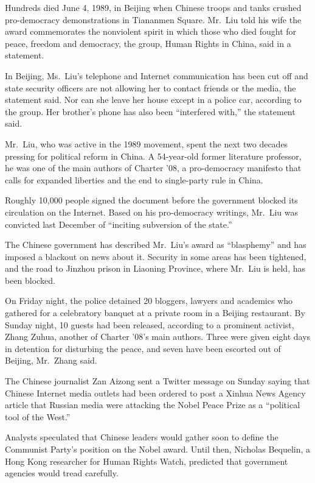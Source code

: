 ﻿\documentclass[12pt]{article}
\begin{document}
Hundreds died June 4, 1989, in Beijing when Chinese troops and tanks crushed pro-democracy
demonstrations in Tiananmen Square. Mr.~Liu told his wife the award commemorates the nonviolent
spirit in which those who died fought for peace, freedom and democracy, the group, Human Rights in
China, said in a statement.

In Beijing, Ms.~Liu's telephone and Internet communication has been cut off and state security
officers are not allowing her to contact friends or the media, the statement said. Nor can she leave
her house except in a police car, according to the group. Her brother's phone has also been
``interfered with,'' the statement said.

Mr.~Liu, who was active in the 1989 movement, spent the next two decades pressing for political
reform in China. A 54-year-old former literature professor, he was one of the main authors of
Charter '08, a pro-democracy manifesto that calls for expanded liberties and the end to single-party
rule in China.

Roughly 10,000 people signed the document before the government blocked its circulation on the
Internet. Based on his pro-democracy writings, Mr.~Liu was convicted last December of ``inciting
subversion of the state.''

The Chinese government has described Mr.~Liu's award as ``blasphemy'' and has imposed a blackout on
news about it. Security in some areas has been tightened, and the road to Jinzhou prison in Liaoning
Province, where Mr.~Liu is held, has been blocked.

On Friday night, the police detained 20 bloggers, lawyers and academics who gathered for a
celebratory banquet at a private room in a Beijing restaurant. By Sunday night, 10 guests had been
released, according to a prominent activist, Zhang Zuhua, another of Charter '08's main authors.
Three were given eight days in detention for disturbing the peace, and seven have been escorted out
of Beijing, Mr.~Zhang said.

The Chinese journalist Zan Aizong sent a Twitter message on Sunday saying that Chinese Internet
media outlets had been ordered to post a Xinhua News Agency article that Russian media were
attacking the Nobel Peace Prize as a ``political tool of the West.''

Analysts speculated that Chinese leaders would gather soon to define the Communist Party's position
on the Nobel award. Until then, Nicholas Bequelin, a Hong Kong researcher for Human Rights Watch,
predicted that government agencies would tread carefully.
\end{document}
